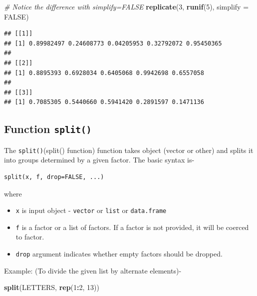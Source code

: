 \documentclass[
]{book}
\newenvironment{Shaded}{\begin{snugshade}}{\end{snugshade}}
\newcommand{\AttributeTok}[1]{\textcolor[rgb]{0.13,0.29,0.53}{#1}}
\newcommand{\CommentTok}[1]{\textcolor[rgb]{0.56,0.35,0.01}{\textit{#1}}}
\newcommand{\ConstantTok}[1]{\textcolor[rgb]{0.56,0.35,0.01}{#1}}
\newcommand{\DecValTok}[1]{\textcolor[rgb]{0.00,0.00,0.81}{#1}}
\newcommand{\FunctionTok}[1]{\textcolor[rgb]{0.13,0.29,0.53}{\textbf{#1}}}
\newcommand{\NormalTok}[1]{#1}
\newcommand{\SpecialCharTok}[1]{\textcolor[rgb]{0.81,0.36,0.00}{\textbf{#1}}}
\providecommand{\tightlist}{%
  \setlength{\itemsep}{0pt}\setlength{\parskip}{0pt}}
\begin{document}
\begin{Shaded}
\begin{Highlighting}[]
\CommentTok{\# Notice the difference with simplify=FALSE}
\FunctionTok{replicate}\NormalTok{(}\DecValTok{3}\NormalTok{, }\FunctionTok{runif}\NormalTok{(}\DecValTok{5}\NormalTok{), }\AttributeTok{simplify =} \ConstantTok{FALSE}\NormalTok{)}
\end{Highlighting}
\end{Shaded}

\begin{verbatim}
## [[1]]
## [1] 0.89982497 0.24608773 0.04205953 0.32792072 0.95450365
## 
## [[2]]
## [1] 0.8895393 0.6928034 0.6405068 0.9942698 0.6557058
## 
## [[3]]
## [1] 0.7085305 0.5440660 0.5941420 0.2891597 0.1471136
\end{verbatim}

\hypertarget{function-split}{%
\subsection{\texorpdfstring{Function \texttt{split()}}{Function split()}}\label{function-split}}

The \texttt{split()}\index(split() function) function takes object (vector or other) and splits it into groups determined by a given factor. The basic syntax is-

\begin{verbatim}
split(x, f, drop=FALSE, ...)
\end{verbatim}

where

\begin{itemize}
\tightlist
\item
  \texttt{x} is input object - \texttt{vector} or \texttt{list} or \texttt{data.frame}
\item
  \texttt{f} is a factor or a list of factors. If a factor is not provided, it will be coerced to factor.
\item
  \texttt{drop} argument indicates whether empty factors should be dropped.
\end{itemize}

Example: (To divide the given list by alternate elements)-

\begin{Shaded}
\begin{Highlighting}[]
\FunctionTok{split}\NormalTok{(LETTERS, }\FunctionTok{rep}\NormalTok{(}\DecValTok{1}\SpecialCharTok{:}\DecValTok{2}\NormalTok{, }\DecValTok{13}\NormalTok{))}
\end{Highlighting}
\end{Shaded}
\end{document}
